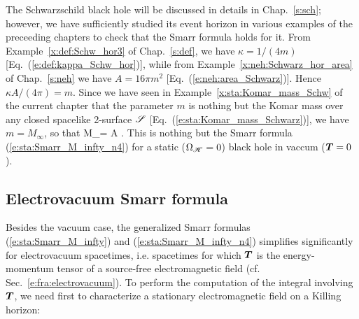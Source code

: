 \begin{example}
The Schwarzschild black hole will be discussed in details in Chap.~\ref{s:sch};
however, we have sufficiently studied its event horizon in various examples
of the preceeding chapters to check that the Smarr formula holds
for it. From Example~\ref{x:def:Schw_hor3} of Chap.~\ref{s:def}, we have
$\kappa = 1/(4 m)$ [Eq.~(\ref{e:def:kappa_Schw_hor})], while from
Example~\ref{x:neh:Schwarz_hor_area} of Chap.~\ref{s:neh} we have
$A = 16\pi m^2$ [Eq.~(\ref{e:neh:area_Schwarz})]. Hence
$\kappa A / (4\pi) = m$. Since we have seen in Example~\ref{x:sta:Komar_mass_Schw}
of the current chapter that the parameter $m$ is nothing but the Komar mass
over any closed spacelike 2-surface $\mathscr{S}$ [Eq.~(\ref{e:sta:Komar_mass_Schwarz})],
we have $m = M_\infty$, so that
\be
    M_\infty = \frac{\kappa}{4\pi} A .
\ee
This is nothing but the Smarr formula (\ref{e:sta:Smarr_M_infty_n4})
for a static ($\Omega_{\mathscr{H}} = 0$) black hole in vaccum ($\bm{T}=0$).
\end{example}

\subsection{Electrovacuum Smarr formula} \label{s:sta:Smarr_electrovac}

Besides the vacuum case, the generalized Smarr formulas (\ref{e:sta:Smarr_M_infty})
and (\ref{e:sta:Smarr_M_infty_n4}) simplifies significantly for
electrovacuum spacetimes, i.e. spacetimes for which $\bm{T}$ is the energy-momentum
tensor of a source-free electromagnetic field (cf. Sec.~\ref{e:fra:electrovacuum}).
To perform the computation of the integral involving $\bm{T}$,
we need first to characterize a stationary electromagnetic field on
a Killing horizon:

